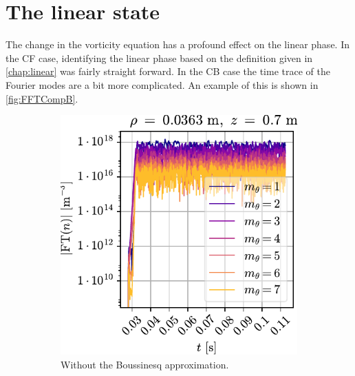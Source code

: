 \section{The linear state}
%
The change in the vorticity equation has a profound effect on the linear phase.
In the CF case, identifying the linear phase based on the definition given in \cref{chap:linear} was fairly straight forward.
In the CB case the time trace of the Fourier modes are a bit more complicated.
An example of this is shown in \cref{fig:FFTCompB}.
%
\begin{figure}[htbp]
    \centering
    \begin{subfigure}[h]{0.45\textwidth}
        \hspace*{-1cm}
        \centering
        \includegraphics{fig/results/compareBouss/FFT006}
        \caption{Without the Boussinesq approximation.}
        \label{fig:FFTWOB}
    \end{subfigure}%
    \hfill
    \begin{subfigure}[h]{0.45\textwidth}
        \hspace*{-1cm}
        \centering

\end{subfigure}
\end{figure}
